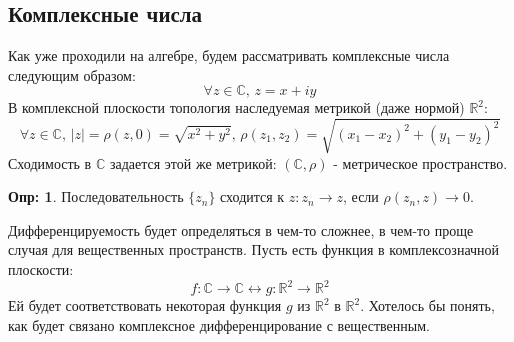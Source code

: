 \documentclass[12pt]{article}
\newcommand{\MR}{\mathbb{R}}
\newcommand{\MC}{\mathbb{C}}
\theoremstyle{definition}
\newtheorem{defn}{Опр:}
\begin{document}
\subsection*{Комплексные числа}
Как уже проходили на алгебре, будем рассматривать комплексные числа следующим образом: 
$$
	\forall z \in \MC, \, z = x + iy 	
$$ 
В комплексной плоскости топология наследуемая метрикой (даже нормой) $\MR^2$:
$$
	\forall z \in \MC, \, |z| = \rho(z,0) = \sqrt{x^2 + y^2}, \, \rho(z_1,z_2) = \sqrt{(x_1 - x_2)^2 + (y_1 - y_2)^2}
$$ 
Сходимость в $\MC$ задается этой же метрикой: $(\MC, \rho)$ - метрическое пространство.
\begin{defn}
	Последовательность $\{z_n\}$ сходится к $z\colon z_n \to z$, если $\rho(z_n,z) \to 0$.
\end{defn}
Дифференцируемость будет определяться в чем-то сложнее, в чем-то проще случая для вещественных пространств. Пусть есть функция в комплексозначной плоскости:
$$
	f \colon \MC \to \MC \longleftrightarrow g \colon \MR^2 \to \MR^2
$$
Ей будет соответствовать некоторая функция $g$ из $\MR^2$ в $\MR^2$. Хотелось бы понять, как будет связано комплексное дифференцирование с вещественным. 
\end{document}
